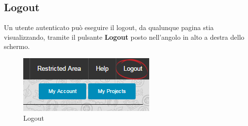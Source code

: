 \subsection{Logout}
Un utente autenticato può eseguire il logout, da qualunque pagina stia visualizzando, tramite il pulsante \textbf{Logout} posto nell'angolo in alto a destra dello schermo.

\begin{figure}[H] 
	\centering 
	\includegraphics[scale=0.80] {img/logout.png}
	\caption{Logout} 
\end{figure}
